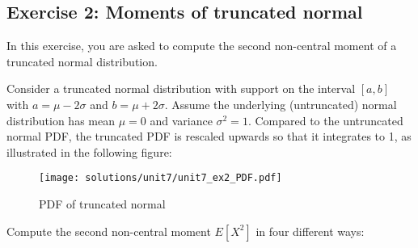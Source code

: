 \documentclass[10pt]{scrartcl}
\begin{document}
    \hypertarget{exercise-2-moments-of-truncated-normal}{%
\subsection{Exercise 2: Moments of truncated
normal}\label{exercise-2-moments-of-truncated-normal}}

In this exercise, you are asked to compute the second non-central moment
of a truncated normal distribution.

Consider a truncated normal distribution with support on the interval
\([a,b]\) with \(a = \mu-2\sigma\) and \(b=\mu+2\sigma\). Assume the
underlying (untruncated) normal distribution has mean \(\mu = 0\) and
variance \(\sigma^2 = 1\). Compared to the untruncated normal PDF, the
truncated PDF is rescaled upwards so that it integrates to 1, as
illustrated in the following figure:

\begin{figure}
\centering
\texttt{[image: solutions/unit7/unit7\_ex2\_PDF.pdf]}
\caption{PDF of truncated normal}
\end{figure}

Compute the second non-central moment \(E[X^2]\) in four different ways:
\end{document}
